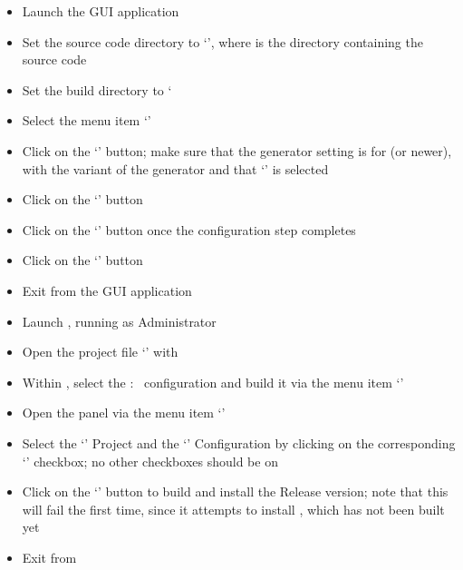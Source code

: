 \begin{itemize}
\item Launch the  GUI application
\item\exSp{}Set the source code directory to `',
where  is the directory containing the \mplusm{} source code
\item\exSp{}Set the build directory to `
\item\exSp{}Select the menu item `'
\item\exSp{}Click on the `' button; make sure that the generator
setting is for  (or newer), with the  variant of
the generator and that `'
is selected
\item\exSp{}Click on the `' button
\item\exSp{}Click on the `' button once the configuration step
completes
\item\exSp{}Click on the `' button
\item\exSp{}Exit from the  GUI application
\item\exSp{}Launch , running as Administrator
\item\exSp{}Open the project file
`' with
\item\exSp{}Within , select the  :\ 
configuration and build it via the menu item
`'
\item\exSp{}Open the  panel via the menu item
`'
\item\exSp{}Select the `' Project and the `'
Configuration by clicking on the corresponding `' checkbox; no other
checkboxes should be on
\item\exSp{}Click on the `' button to build and install the Release
version; note that this will fail the first time, since it attempts to install
\textit{\MMMU}, which has not been built yet
\item\exSp{}Exit from 
\end{itemize}
\tertiaryEnd
{}
